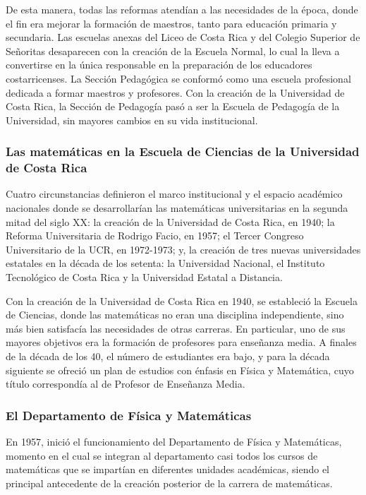 De esta manera, todas las reformas atendían a las necesidades de la época, donde el fin era mejorar la formación de maestros, tanto para educación primaria y secundaria. Las escuelas anexas del Liceo de Costa Rica y del Colegio Superior de Señoritas desaparecen con la creación de la Escuela Normal, lo cual la lleva a convertirse en la única responsable en la preparación de los
educadores costarricenses. La Sección Pedagógica se conformó como una escuela profesional dedicada a formar maestros y profesores. Con la creación de la Universidad de Costa Rica, la Sección de Pedagogía pasó a ser la Escuela de Pedagogía de la Universidad, sin mayores cambios en su vida institucional. 

 \subsubsection*{ Las matemáticas en la Escuela de Ciencias de la Universidad de Costa Rica }
 
Cuatro circunstancias definieron el marco institucional y el espacio académico nacionales donde se desarrollarían las matemáticas universitarias en la segunda mitad del siglo XX: la creación de la Universidad de Costa Rica, en 1940; la Reforma Universitaria de Rodrigo Facio, en 1957; el Tercer Congreso Universitario de la UCR, en 1972-1973; y, la creación de tres nuevas universidades estatales en la década de los setenta: la Universidad Nacional, el Instituto Tecnológico de Costa Rica
y la Universidad Estatal a Distancia.

Con la creación de la Universidad de Costa Rica en 1940, se estableció la Escuela de Ciencias, donde las matemáticas no eran una disciplina independiente, sino más bien satisfacía las necesidades de otras carreras. En particular, uno de sus mayores objetivos era la formación de profesores para enseñanza media. A finales de la década de los 40, el número de estudiantes era bajo, y para la década siguiente se ofreció un plan de estudios con énfasis en Física y Matemática, cuyo título correspondía al de Profesor de Enseñanza Media. 

 \subsubsection*{El Departamento de Física y Matemáticas }

En 1957, inició el funcionamiento del Departamento de Física y Matemáticas, momento en el cual se integran al departamento casi todos los cursos de matemáticas que se impartían en diferentes unidades académicas, siendo el principal antecedente de la creación posterior de la carrera de matemáticas. 

